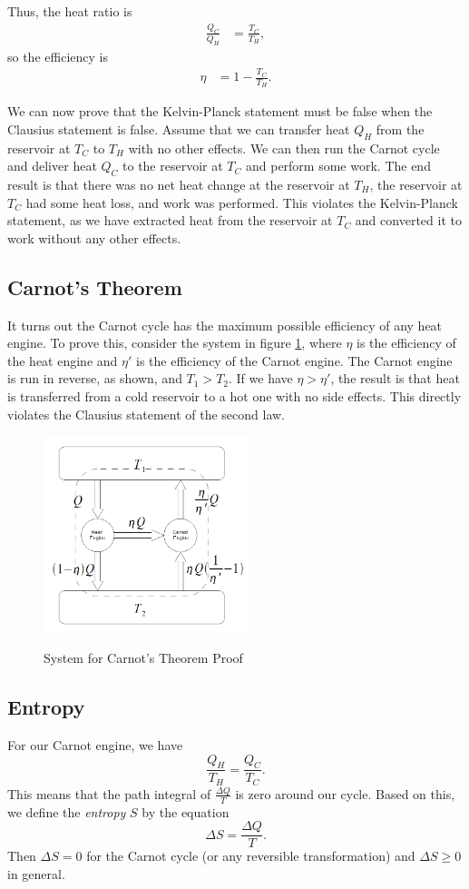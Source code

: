 Thus, the heat ratio is
\begin{align*}
\frac{Q_C}{Q_H} &= \frac{T_C}{T_H}, 
\end{align*} 
so the efficiency is \begin{align}\eta &=1-\frac{T_C}{T_H}. \label{eff} \end{align}

We can now prove that the Kelvin-Planck statement must be false when the Clausius statement is false. Assume that we can transfer heat $Q_H$ from the reservoir at $T_C$ to $T_H$ with no other effects. We can then run the Carnot cycle and deliver heat $Q_C$ to the reservoir at $T_C$ and perform some work. The end result is that there was no net heat change at the reservoir at $T_H$, the reservoir at $T_C$ had some heat loss, and work was performed. This violates the Kelvin-Planck statement, as we have extracted heat from the reservoir at $T_C$ and converted it to work without any other effects. 

\subsection{Carnot's Theorem}
It turns out the Carnot cycle has the maximum possible efficiency of any heat engine. To prove this, consider the system in figure \ref{fig:proof}, where $\eta$ is the efficiency of the heat engine and $\eta'$ is the efficiency of the Carnot engine. The Carnot engine is run in reverse, as shown, and $T_1 > T_2$. If we have $\eta > \eta'$, the result is that heat is transferred from a cold reservoir to a hot one with no side effects. This directly violates the Clausius statement of the second law.

\begin{figure}[ht]
\centering
\caption{System for Carnot's Theorem Proof}
\includegraphics[width=6cm]{images/thermo/proof.png}
\label {fig:proof}
\end{figure}
\subsection{Entropy}
For our Carnot engine, we have $$\frac{Q_H}{T_H} = \frac{Q_C}{T_C}.$$ This means that the path integral of $\tfrac{\Delta Q}{T}$ is zero around our cycle. Based on this, we define the \textit{entropy} $S$ by the equation  $$\Delta S = \frac{\Delta Q}{T}.$$ Then $\Delta S = 0$ for the Carnot cycle (or any reversible transformation) and $\Delta S \geq 0$ in general.
